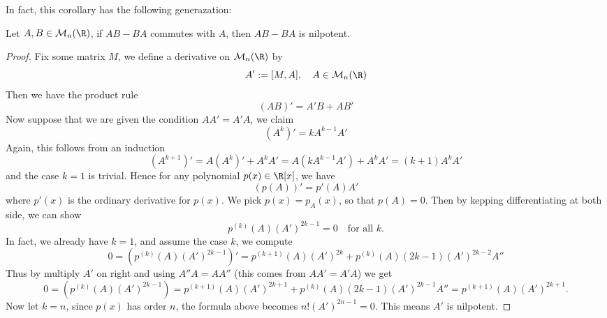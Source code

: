 In fact, this corollary has the following generazation:
\begin{proposition}
Let $A,B\in\mathcal{M}_n(\R)$, if $AB-BA$ commutes with $A$, then $AB-BA$ is nilpotent.
\end{proposition}
\begin{proof}
Fix some matrix $M$, we define a derivative on $\mathcal{M}_n(\R)$ by 
\[A':=[M,A],\quad A\in\mathcal{M}_n(\R)\]
Then we have the product rule
\[(AB)'=A'B+AB'\]
Now suppose that we are given the condition $AA'=A'A$, we claim
\[(A^k)'=kA^{k-1}A'\]
Again, this follows from an induction
\[(A^{k+1})'=A(A^k)'+A^kA'=A(kA^{k-1}A')+A^kA'=(k+1)A^kA'\]
and the case $k=1$ is trivial. Hence for any polynomial $p(x)\in\R[x]$, we have
\[(p(A))'=p'(A)A'\]
where $p'(x)$ is the ordinary derivative for $p(x)$. We pick $p(x)=p_A(x)$, so that $p(A)=0$. Then by kepping differentiating at both side, we can show
\[p^{(k)}(A)(A')^{2k-1}=0\quad\text{for all }k.\]
In fact, we already have $k=1$, and assume the case $k$, we compute
\[0=(p^{(k)}(A)(A')^{2k-1})'=p^{(k+1)}(A)(A')^{2k}+p^{(k)}(A)(2k-1)(A')^{2k-2}A''\]
Thus by multiply $A'$ on right and using $A''A=AA''$ (this comes from $AA'=A'A$) we get
\[0=(p^{(k)}(A)(A')^{2k-1})=p^{(k+1)}(A)(A')^{2k+1}+p^{(k)}(A)(2k-1)(A')^{2k-1}A''=p^{(k+1)}(A)(A')^{2k+1}.\]
Now let $k=n$, since $p(x)$ has order $n$, the formula above becomes $n!(A')^{2n-1}=0$. This means $A'$ is nilpotent.
\end{proof}

